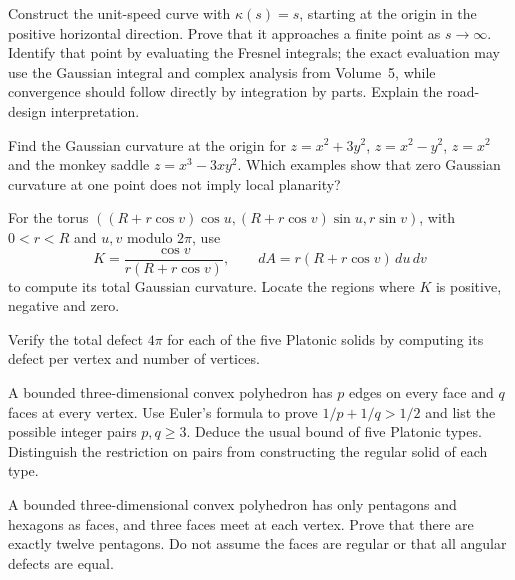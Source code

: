 \begin{exercise}[$\star\star$]\label{geometry:ex:clothoid}
Construct the unit-speed curve with $\kappa(s)=s$, starting at the origin in the positive horizontal direction. Prove that it approaches a finite point as $s\to\infty$. Identify that point by evaluating the Fresnel integrals; the exact evaluation may use the Gaussian integral and complex analysis from Volume~5, while convergence should follow directly by integration by parts. Explain the road-design interpretation.
\end{exercise}

\begin{exercise}[$\star$]\label{geometry:ex:surfacesK}
Find the Gaussian curvature at the origin for $z=x^2+3y^2$, $z=x^2-y^2$, $z=x^2$ and the monkey saddle $z=x^3-3xy^2$. Which examples show that zero Gaussian curvature at one point does not imply local planarity?
\end{exercise}

\begin{exercise}[$\star\star$]\label{geometry:ex:torusK}
For the torus $((R+r\cos v)\cos u,(R+r\cos v)\sin u,r\sin v)$, with $0<r<R$ and $u,v$ modulo $2\pi$, use
\[
K=\frac{\cos v}{r(R+r\cos v)},\qquad dA=r(R+r\cos v)\,du\,dv
\]
to compute its total Gaussian curvature. Locate the regions where $K$ is positive, negative and zero.
\end{exercise}

\begin{exercise}[$\star$]\label{geometry:ex:platonic}
Verify the total defect $4\pi$ for each of the five Platonic solids by computing its defect per vertex and number of vertices.
\end{exercise}

\begin{exercise}[$\star\star$]\label{geometry:ex:fiveplatonic}
A bounded three-dimensional convex polyhedron has $p$ edges on every face and $q$ faces at every vertex. Use Euler's formula to prove $1/p+1/q>1/2$ and list the possible integer pairs $p,q\ge3$. Deduce the usual bound of five Platonic types. Distinguish the restriction on pairs from constructing the regular solid of each type.
\end{exercise}

\begin{exercise}[$\star$]\label{geometry:ex:football}
A bounded three-dimensional convex polyhedron has only pentagons and hexagons as faces, and three faces meet at each vertex. Prove that there are exactly twelve pentagons. Do not assume the faces are regular or that all angular defects are equal.
\end{exercise}

